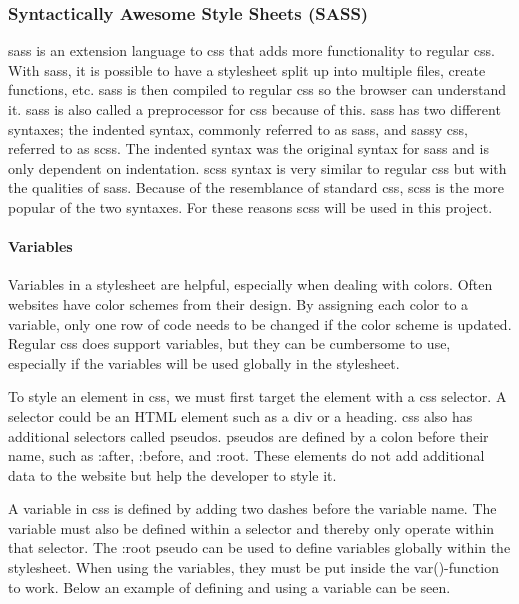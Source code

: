 \subsubsection{Syntactically Awesome Style Sheets (SASS)}%
\label{sub:sass}
\acrfull{sass} is an extension language to \acrshort{css} that adds more functionality to regular \acrshort{css}. With \acrshort{sass}, it is possible to have a stylesheet split up into multiple files, create functions, etc. \acrshort{sass} is then compiled to regular \acrshort{css} so the browser can understand it. \acrshort{sass} is also called a preprocessor for \acrshort{css} because of this. \acrshort{sass} has two different syntaxes; the indented syntax, commonly referred to as \acrshort{sass}, and sassy \acrshort{css}, referred to as \acrshort{scss}. The indented syntax was the original syntax for \acrshort{sass} and is only dependent on indentation. \acrshort{scss} syntax is very similar to regular \acrshort{css} but with the qualities of \acrshort{sass}. Because of the resemblance of standard \acrshort{css}, \acrshort{scss} is the more popular of the two syntaxes. For these reasons \acrshort{scss} will be used in this project.


\paragraph{Variables}
Variables in a stylesheet are helpful, especially when dealing with colors. Often websites have color schemes from their design. By assigning each color to a variable, only one row of code needs to be changed if the color scheme is updated. Regular \acrshort{css} does support variables, but they can be cumbersome to use, especially if the variables will be used globally in the stylesheet.

To style an element in \acrshort{css}, we must first target the element with a \acrshort{css} selector. A selector could be an HTML element such as a div or a heading. \acrshort{css} also has additional selectors called \glspl{pseudo}. \Glspl{pseudo} are defined by a colon before their name, such as :after, :before, and :root. These elements do not add additional data to the website but help the developer to style it. 

A variable in \acrshort{css} is defined by adding two dashes before the variable name.  The variable must also be defined within a selector and thereby only operate within that selector. The :root \gls{pseudo} can be used to define variables globally within the stylesheet. When using the variables, they must be put inside the var()-function to work.
Below an example of defining and using a variable can be seen. 

